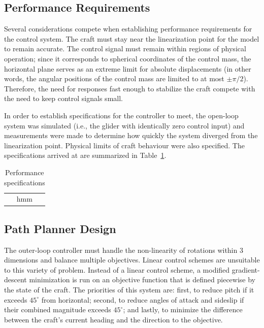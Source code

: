 \documentclass{sydeStyle}
\begin{document}
\subsection{Performance Requirements}
\label{sec:perfreq}

Several considerations compete when establishing performance requirements for
the control system.  The craft must stay near the linearization point for the
model to remain accurate.  The control signal must remain within regions of
physical operation; since it corresponds to spherical coordinates of the control
mass, the horizontal plane serves as an extreme limit for absolute displacements
(in other words, the angular positions of the control mass are limited to at
most $\pm \pi/2$).  Therefore, the need for responses fast enough to stabilize
the craft compete with the need to keep control signals small.

In order to establish specifications for the controller to meet, the open-loop
system was simulated (i.e., the glider with identically zero control input) and
measurements were made to determine how quickly the system diverged from the
linearization point.  Physical limits of craft behaviour were also specified.
The specifications arrived at are summarized in Table~\ref{tab:specs}.

\begin{table}[b]
    \centering
    \begin{tabular}{|c|}
        hmm
    \end{tabular}
    \caption{Performance specifications}
    \label{tab:specs}
\end{table}

\subsection{Path Planner Design}
\label{sec:ppdesign}
The outer-loop controller must handle the non-linearity of rotations within 3
dimensions and balance multiple objectives. Linear control schemes are
unsuitable to this variety of problem. Instead of a linear control scheme, a
modified gradient-descent minimization is run on an objective function that is
defined piecewise by the state of the craft. The priorities of this system are:
first, to reduce pitch if it exceeds $45^{\circ}$ from horizontal; second,
to reduce angles of attack and sideslip if their combined magnitude exceeds
$45^{\circ}$; and lastly, to minimize the difference between the craft's current
heading and the direction to the objective.
\end{document}
